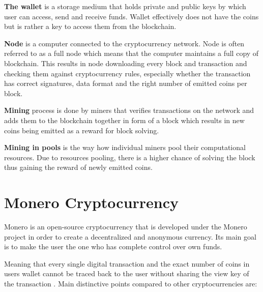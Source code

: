 \documentclass[
  printed, %
  table,   %
  nolof,     %
  nolot,     %
           oneside, color
]{fithesis3}
\begin{document}
\textbf{The wallet} is a storage medium that holds private and public keys by which user can access, send and receive funds. Wallet effectively does not have the coins but is rather a key to access them from the blockchain.

\textbf{Node} is a computer connected to the cryptocurrency network. Node is often referred to as a full node which means that the computer maintains a full copy of blockchain. This results in node downloading every block and transaction and checking them against cryptocurrency rules, especially whether the transaction has correct signatures, data format and the right number of emitted coins per block.

\textbf{Mining} process is done by miners that verifies transactions on the network and adds them to the blockchain together in form of a block which results in new coins being emitted as a reward for block solving.

\textbf{Mining in pools} is the way how individual miners pool their computational resources. Due to resources pooling, there is a higher chance of solving the block thus gaining the reward of newly emitted coins. %

\chapter{Monero Cryptocurrency}

Monero is an open-source cryptocurrency that is developed under the Monero project in order to create a decentralized and anonymous currency. Its main goal is to make the user the one who has complete control over own funds.


Meaning that every single digital transaction and the exact number of coins in users wallet cannot be traced back to the user without sharing the view key of the transaction \cite{moneroprojectgithub}.  Main distinctive points compared to other cryptocurrencies are:
\end{document}
